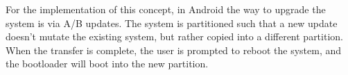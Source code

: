 For the implementation of this concept, in Android the way
to upgrade the system is via A/B updates. The system is partitioned
such that a new update doesn't mutate the existing system,
but rather copied into a different partition. When the
transfer is complete, the user is prompted to reboot the
system, and the bootloader will boot into the new partition.

